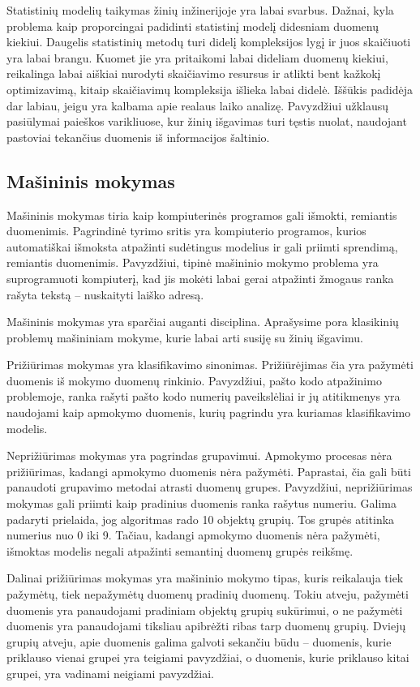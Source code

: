 Statistinių modelių taikymas žinių inžinerijoje yra labai svarbus.
Dažnai, kyla problema kaip proporcingai padidinti statistinį modelį didesniam duomenų kiekiui.
Daugelis statistinių metodų turi didelį kompleksijos lygį ir juos skaičiuoti yra labai brangu.
Kuomet jie yra pritaikomi labai dideliam duomenų kiekiui, reikalinga labai aiškiai nurodyti skaičiavimo resursus ir atlikti bent kažkokį optimizavimą, kitaip skaičiavimų kompleksija išlieka labai didelė.
Iššūkis padidėja dar labiau, jeigu yra kalbama apie realaus laiko analizę.
Pavyzdžiui užklausų pasiūlymai paieškos varikliuose, kur žinių išgavimas turi tęstis nuolat, naudojant pastoviai tekančius duomenis iš informacijos šaltinio.

\subsection{Mašininis mokymas}

Mašininis mokymas tiria kaip kompiuterinės programos gali išmokti, remiantis duomenimis.
Pagrindinė tyrimo sritis yra kompiuterio programos, kurios automatiškai išmoksta atpažinti sudėtingus modelius ir gali priimti sprendimą, remiantis duomenimis.
Pavyzdžiui, tipinė mašininio mokymo problema yra suprogramuoti kompiuterį, kad jis mokėti labai gerai atpažinti žmogaus ranka rašyta tekstą -- nuskaityti laiško adresą.

Mašininis mokymas yra sparčiai auganti disciplina.
Aprašysime pora klasikinių problemų mašininiam mokyme, kurie labai arti susiję su žinių išgavimu.

Prižiūrimas mokymas yra klasifikavimo sinonimas.
Prižiūrėjimas čia yra pažymėti duomenis iš mokymo duomenų rinkinio.
Pavyzdžiui, pašto kodo atpažinimo problemoje, ranka rašyti pašto kodo numerių paveikslėliai ir jų atitikmenys yra naudojami kaip apmokymo duomenis, kurių pagrindu yra kuriamas klasifikavimo modelis.

Neprižiūrimas mokymas yra pagrindas grupavimui.
Apmokymo procesas nėra prižiūrimas, kadangi apmokymo duomenis nėra pažymėti.
Paprastai, čia gali būti panaudoti grupavimo metodai atrasti duomenų grupes.
Pavyzdžiui, neprižiūrimas mokymas gali priimti kaip pradinius duomenis ranka rašytus numeriu.
Galima padaryti prielaida, jog algoritmas rado 10 objektų grupių.
Tos grupės atitinka numerius nuo 0 iki 9.
Tačiau, kadangi apmokymo duomenis nėra pažymėti, išmoktas modelis negali atpažinti semantinį duomenų grupės reikšmę.

Dalinai prižiūrimas mokymas yra mašininio mokymo tipas, kuris reikalauja tiek pažymėtų, tiek nepažymėtų duomenų pradinių duomenų.
Tokiu atveju, pažymėti duomenis yra panaudojami pradiniam objektų grupių sukūrimui, o ne pažymėti duomenis yra panaudojami tiksliau apibrėžti ribas tarp duomenų grupių.
Dviejų grupių atveju, apie duomenis galima galvoti sekančiu būdu -- duomenis, kurie priklauso vienai grupei yra teigiami pavyzdžiai, o duomenis, kurie priklauso kitai grupei, yra vadinami neigiami pavyzdžiai.

